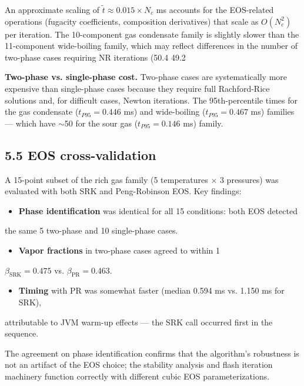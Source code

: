 \documentclass[review,3p]{custom}
\begin{document}
{An approximate scaling of $\tilde{t} \approx 0.015 \times N_c$ ms accounts for
the EOS-related operations (fugacity coefficients, composition derivatives)
that scale as $O(N_c^2)$ per iteration. The 10-component gas condensate family
is slightly slower than the 11-component wide-boiling family, which may reflect
differences in the number of two-phase cases requiring NR iterations (50.4%
49.2%

\textbf{Two-phase vs. single-phase cost.} Two-phase cases are systematically more
expensive than single-phase cases because they require full Rachford-Rice
solutions and, for difficult cases, Newton iterations. The 95th-percentile times
for the gas condensate ($t_{P95} = 0.446$ ms) and wide-boiling ($t_{P95} = 0.467$ ms)
families — which have $\sim$50%
for the sour gas ($t_{P95} = 0.146$ ms) family.

\subsection{5.5 EOS cross-validation}

A 15-point subset of the rich gas family (5 temperatures × 3 pressures) was evaluated
with both SRK and Peng-Robinson EOS. Key findings:

\begin{itemize}
  \item \textbf{Phase identification} was identical for all 15 conditions: both EOS detected
\end{itemize}
  the same 5 two-phase and 10 single-phase cases.
\begin{itemize}
  \item \textbf{Vapor fractions} in two-phase cases agreed to within 1%
\end{itemize}
  $\beta_{\text{SRK}} = 0.475$ vs. $\beta_{\text{PR}} = 0.463$.
\begin{itemize}
  \item \textbf{Timing} with PR was somewhat faster (median 0.594 ms vs. 1.150 ms for SRK),
\end{itemize}
  attributable to JVM warm-up effects — the SRK call occurred first in the sequence.

The agreement on phase identification confirms that the algorithm's robustness is
not an artifact of the EOS choice; the stability analysis and flash iteration
machinery function correctly with different cubic EOS parameterizations.

}
\end{document}
